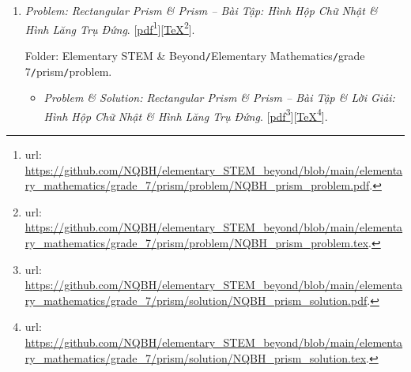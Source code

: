\documentclass[12pt,twoside]{book}
\begin{document}
\begin{enumerate}
	Folder: {\sf Elementary STEM \& Beyond{\tt/}Elementary Mathematics{\tt/}grade 7{\tt/}real{\tt/}problem}.
	\begin{itemize}
		\item {\it Problem \& Solution: Real $\mathbb{R}$ -- Bài Tập \& Lời Giải: Số Thực $\mathbb{R}$}. [\href{https://github.com/NQBH/elementary_STEM_beyond/blob/main/elementary_mathematics/grade_7/real/problem/NQBH_real_solution.pdf}{pdf}\footnote{{\sc url}: \url{https://github.com/NQBH/elementary_STEM_beyond/blob/main/elementary_mathematics/grade_7/real/problem/NQBH_real_solution.pdf}.}][\href{https://github.com/NQBH/elementary_STEM_beyond/blob/main/elementary_mathematics/grade_7/real/problem/NQBH_real_solution.tex}{\TeX}\footnote{{\sc url}: \url{https://github.com/NQBH/elementary_STEM_beyond/blob/main/elementary_mathematics/grade_7/real/problem/NQBH_real_solution.tex}.}].
		
		Folder: {\sf Elementary STEM \& Beyond{\tt/}Elementary Mathematics{\tt/}grade 7{\tt/}real{\tt/}solution}.
	\end{itemize}
	\item {\it Problem: Rectangular Prism \& Prism -- Bài Tập: Hình Hộp Chữ Nhật \& Hình Lăng Trụ Đứng}. [\href{https://github.com/NQBH/elementary_STEM_beyond/blob/main/elementary_mathematics/grade_7/prism/problem/NQBH_prism_problem.pdf}{pdf}\footnote{{\sc url}: \url{https://github.com/NQBH/elementary_STEM_beyond/blob/main/elementary_mathematics/grade_7/prism/problem/NQBH_prism_problem.pdf}.}][\href{https://github.com/NQBH/elementary_STEM_beyond/blob/main/elementary_mathematics/grade_7/prism/problem/NQBH_prism_problem.tex}{\TeX}\footnote{{\sc url}: \url{https://github.com/NQBH/elementary_STEM_beyond/blob/main/elementary_mathematics/grade_7/prism/problem/NQBH_prism_problem.tex}.}].
	
	Folder: {\sf Elementary STEM \& Beyond{\tt/}Elementary Mathematics{\tt/}grade 7{\tt/}prism{\tt/}problem}.
	\begin{itemize}
		\item {\it Problem \& Solution: Rectangular Prism \& Prism -- Bài Tập \& Lời Giải: Hình Hộp Chữ Nhật \& Hình Lăng Trụ Đứng}. [\href{https://github.com/NQBH/elementary_STEM_beyond/blob/main/elementary_mathematics/grade_7/prism/solution/NQBH_prism_solution.pdf}{pdf}\footnote{{\sc url}: \url{https://github.com/NQBH/elementary_STEM_beyond/blob/main/elementary_mathematics/grade_7/prism/solution/NQBH_prism_solution.pdf}.}][\href{https://github.com/NQBH/elementary_STEM_beyond/blob/main/elementary_mathematics/grade_7/prism/solution/NQBH_prism_solution.tex}{\TeX}\footnote{{\sc url}: \url{https://github.com/NQBH/elementary_STEM_beyond/blob/main/elementary_mathematics/grade_7/prism/solution/NQBH_prism_solution.tex}.}].
		

\end{itemize}
\end{enumerate}
\end{document}
